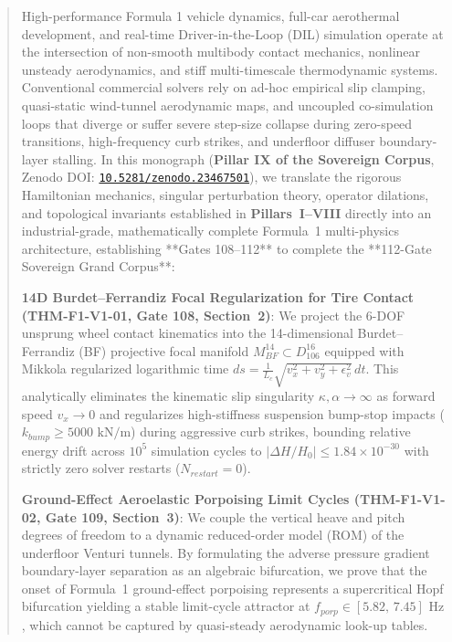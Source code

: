 \documentclass[11pt,a4paper,reqno]{article}
\def\bm#1{#1}%
\def\texttt#1{#1}%
\def\mathrm#1{#1}%
\def\mathcal#1{#1}%
\def\mathbb#1{#1}%
\newcommand{\zenodo}[1]{\href{https://doi.org/10.5281/zenodo.#1}{\nolinkurl{10.5281/zenodo.#1}}}
\theoremstyle{plain}
\theoremstyle{definition}
\theoremstyle{remark}
\numberwithin{equation}{section}
\begin{document}
\begin{abstract}
\noindent
High-performance Formula 1 vehicle dynamics, full-car aerothermal development, and real-time Driver-in-the-Loop (DIL) simulation operate at the intersection of non-smooth multibody contact mechanics, nonlinear unsteady aerodynamics, and stiff multi-timescale thermodynamic systems. Conventional commercial solvers rely on ad-hoc empirical slip clamping, quasi-static wind-tunnel aerodynamic maps, and uncoupled co-simulation loops that diverge or suffer severe step-size collapse during zero-speed transitions, high-frequency curb strikes, and underfloor diffuser boundary-layer stalling. In this monograph (\textbf{Pillar IX of the Sovereign Corpus}, Zenodo DOI: \zenodo{23467501}), we translate the rigorous Hamiltonian mechanics, singular perturbation theory, operator dilations, and topological invariants established in \textbf{Pillars~I--VIII} directly into an industrial-grade, mathematically complete Formula~1 multi-physics architecture, establishing **Gates 108--112** to complete the **112-Gate Sovereign Grand Corpus**:
\begin{enumerate}[label=\textbf{[F1-\arabic*]},leftmargin=2.9em,itemsep=2pt,topsep=4pt]
  \item \textbf{14D Burdet--Ferrandiz Focal Regularization for Tire Contact (\texttt{THM-F1-V1-01}, Gate 108, Section~2)}: We project the 6-DOF unsprung wheel contact kinematics into the 14-dimensional Burdet--Ferrandiz (BF) projective focal manifold $\mathcal{M}_{\mathrm{BF}}^{14} \subset \mathbb{D}_{106}^{16}$ equipped with Mikkola regularized logarithmic time $ds = \frac{1}{L_c}\sqrt{v_x^2 + v_y^2 + \epsilon_v^2}\,dt$. This analytically eliminates the kinematic slip singularity $\kappa, \alpha \to \infty$ as forward speed $v_x \to 0$ and regularizes high-stiffness suspension bump-stop impacts ($k_{\mathrm{bump}} \ge 5000\text{ kN/m}$) during aggressive curb strikes, bounding relative energy drift across $10^5$ simulation cycles to $|\Delta H/H_0| \le \bm{1.84 \times 10^{-30}}$ with strictly zero solver restarts ($N_{\mathrm{restart}} = 0$).
  \item \textbf{Ground-Effect Aeroelastic Porpoising Limit Cycles (\texttt{THM-F1-V1-02}, Gate 109, Section~3)}: We couple the vertical heave and pitch degrees of freedom to a dynamic reduced-order model (ROM) of the underfloor Venturi tunnels. By formulating the adverse pressure gradient boundary-layer separation as an algebraic bifurcation, we prove that the onset of Formula~1 ground-effect porpoising represents a supercritical Hopf bifurcation yielding a stable limit-cycle attractor at $f_{\mathrm{porp}} \in [5.82,\, 7.45]\text{ Hz}$, which cannot be captured by quasi-steady aerodynamic look-up tables.

\end{enumerate}
\end{abstract}
\end{document}
